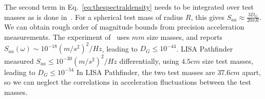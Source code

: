 \documentclass[aps,preprintnumbers,superscriptaddress,longbibliography]{revtex4-1}
\begin{document}
The second term in Eq.~\eqref{eq:thespectraldensity} needs to be integrated over test masses as is done in~\cite{oppenheim2022gravitationally}. For a spherical test mass of radius $R$, this gives $S_{aa}\approx \frac{3D_G}{20\pi R}$.
We can obtain rough order of magnitude bounds from precision acceleration measurements. The experiment of~\cite{westphal2021measurement} uses $\unit{mm}$ 
size masses, and reports $S_{aa}(\omega)\sim 10^{-18}\unit{(m/s^2)^2/Hz}$, leading to 
$D_G\leq 10^{-44}$. %
LISA Pathfinder~\cite{armano2018beyond,armano2024depth} measured $S_{aa}\leq 10^{-30}\unit{(m/s^2)^2/Hz}$ differentially, using $4.5 \unit{cm}$ size test masses, leading to $D_G\leq 10^{-54}$ %
In LISA Pathfinder, the two test masses are $37.6 \unit{cm}$ apart, so we can neglect the correlations in acceleration fluctuations between the test masses. 
\end{document}
